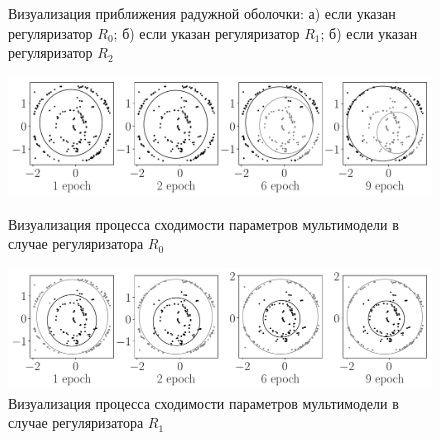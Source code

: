 \begin{figure}[h!]
\caption{Визуализация приближения радужной оболочки: а) если указан регуляризатор $ R_0 $; б) если указан регуляризатор $ R_1 $; б) если указан регуляризатор $ R_2 $}
\label{ce:fig6}
\end{figure}


\begin{figure}
\center
     \includegraphics[width=\textwidth]{results/priorexpertfig/experiment_real_not_prior}\\
     \caption{Визуализация процесса сходимости параметров мультимодели в случае регуляризатора $ R_0 $}
    \label{ce:fig7}
\end{figure}

\begin{figure}
\center
     \includegraphics[width=\textwidth]{results/priorexpertfig/experiment_real_prior}
     \caption{Визуализация процесса сходимости параметров мультимодели в случае регуляризатора $ R_1 $}
    \label{ce:fig8}
\end{figure}

